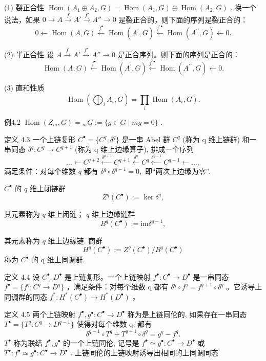 \documentclass[]{article}
\begin{document}
(1) 裂正合性 $\operatorname{Hom}(A_1 \oplus A_2, G) = \operatorname{Hom}(A_1, G) \oplus \operatorname{Hom}(A_2, G)$ . 换一个说法，如果 $0 \longrightarrow A \xrightarrow{f} A' \xrightarrow{f'} A'' \longrightarrow 0$ 是裂正合的，则下面的序列是裂正合的： $$
0 \longleftarrow \operatorname{Hom} (A, G) \xleftarrow {f ^ {\bullet}} \operatorname{Hom} (A ^ {\prime}, G) \xleftarrow {f ^ {\prime \bullet}} \operatorname{Hom} (A ^ {\prime \prime}, G) \longleftarrow 0.
$$

(2) 半正合性 设 $A \xrightarrow{f} A' \xrightarrow{f'} A'' \longrightarrow 0$ 是正合序列。则下面的序列是正合的： $$
\operatorname{Hom} (A, G) \xleftarrow {f ^ {\bullet}} \operatorname{Hom} (A ^ {\prime}, G) \xleftarrow {f ^ {\prime \bullet}} \operatorname{Hom} (A ^ {\prime \prime}, G) \xleftarrow {} 0.
$$

(3) 直和性质 $$
\operatorname{Hom} \left(\bigoplus_ {i} A _ {i}, G\right) = \prod_ {i} \operatorname{Hom} \left(A _ {i}, G\right).
$$

例4.2 $\operatorname{Hom}(Z_m, G) = {}_m G := \{g \in G \mid mg = 0\}$ . 

定义 4.3 一个上链复形 $C^{\bullet}=\{C^{q},\delta^{q}\}$ 是一串 Abel 群 $C^{q}$ (称为 q 维上链群) 和一串同态 $\delta^{q}:C^{q}\to C^{q+1}$ (称为 q 维上边缘算子), 排成一个序列 $$
\dots \leftarrow C ^ {q + 2} \xleftarrow {\delta^ {q + 1}} C ^ {q + 1} \xleftarrow {\delta^ {q}} C ^ {q} \xleftarrow {\delta^ {q - 1}} C ^ {q - 1} \leftarrow \dots ,
$$满足条件：对每个维数 $q$ 都有 $\delta^q\circ \delta^{q - 1} = 0,$ 即“两次上边缘为零”. 

$C^{\bullet}$ 的 $q$ 维上闭链群 $$
Z ^ {q} (C ^ {\bullet}) := \ker \delta^ {q},
$$

其元素称为 $q$ 维上闭链； $q$ 维上边缘链群 $$
B ^ {q} (C ^ {\bullet}) := \mathrm{im} \delta^ {q - 1},
$$

其元素称为 $q$ 维上边缘链. 商群 $$
H ^ {q} (C ^ {\bullet}) := Z ^ {q} (C ^ {\bullet}) / B ^ {q} (C ^ {\bullet})
$$称为 $C^{\bullet}$ 的 q 维上同调群. 

定义 4.4 设 $C^{\bullet}, D^{\bullet}$ 是上链复形。一个上链映射 $f^{\bullet}: C^{\bullet} \to D^{\bullet}$ 是一串同态 $f^{\bullet} = \{f^{q}: C^{q} \to D^{q}\}$ ，满足条件：对每个维数 q 都有 $\delta^{q} \circ f^{q} = f^{q+1} \circ \delta^{q}$ 。它诱导上同调群的同态 $f^{*}: H^{*}(C^{\bullet}) \to H^{*}(D^{\bullet})$ 。 

定义 4.5 两个上链映射 $f^{\bullet}, g^{\bullet}: C^{\bullet} \rightarrow D^{\bullet}$ 称为是上链同伦的, 如果存在一串同态 $T^{\bullet} = \{T^{q}: C^{q} \rightarrow D^{q-1}\}$ 使得对每个维数 q, 都有 $$
\delta^ {q - 1} \circ T ^ {q} + T ^ {q + 1} \circ \delta^ {q} = g ^ {q} - f ^ {q}.
$$$T^{\bullet}$ 称为联结 $f^{\bullet}, g^{\bullet}$ 的一个上链同伦, 记号是 $f^{\bullet} \simeq g^{\bullet}: C^{\bullet} \to D^{\bullet}$ 或 $T^{\bullet}: f^{\bullet} \simeq g^{\bullet}: C^{\bullet} \to D^{\bullet}$ . 上链同伦的上链映射诱导出相同的上同调同态
\end{document}
